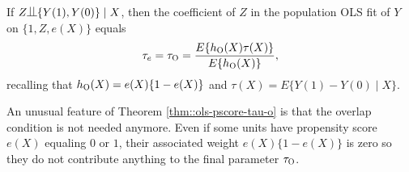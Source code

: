 \begin{theorem}\label{thm::ols-pscore-tau-o}
If $Z\ind \{  Y(1), Y(0) \} \mid X$, then the coefficient of $Z$ in the population OLS fit of $Y$ on $\{1, Z, e(X)\}$ equals
$$
\tau_e=  \tau_\textsc{O} = \frac{  E\{ h_\textsc{O}(X) \tau(X) \} }{ E\{ h_\textsc{O}(X) \} },
$$
recalling that $ h_\textsc{O}(X)  = e(X) \{ 1- e(X)  \} $ and $\tau(X) = E\{ Y(1) - Y(0) \mid X  \}$. 
\end{theorem}


An unusual feature of Theorem \ref{thm::ols-pscore-tau-o} is that the overlap condition is not needed anymore. Even if some units have propensity score $e(X)$ equaling $0$ or $1$, their associated weight $ e(X) \{ 1- e(X) \}$ is zero so they do not contribute anything to the final parameter $ \tau_\textsc{O} $. 


